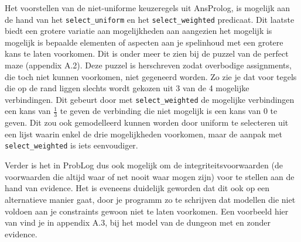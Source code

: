 \documentclass{article}
\begin{document}
Het voorstellen van de niet-uniforme keuzeregels uit AnsProlog, is mogelijk aan de hand van het \texttt{select\_uniform} en het \texttt{select\_weighted} predicaat. Dit laatste biedt een grotere variatie aan mogelijkheden aan aangezien het mogelijk is mogelijk is bepaalde elementen of aspecten aan je spelinhoud met een grotere kans te laten voorkomen. Dit is onder meer te zien bij de puzzel van de perfect maze (appendix A.2). Deze puzzel is herschreven zodat overbodige assignments, die toch niet kunnen voorkomen, niet gegeneerd worden. Zo zie je dat voor tegels die op de rand liggen slechts wordt gekozen uit 3 van de 4 mogelijke verbindingen. Dit gebeurt door met \texttt{select\_weighted} de mogelijke verbindingen een kans van $\frac{1}{3}$ te geven de verbinding die niet mogelijk is een kans van 0 te geven. Dit zou ook gemodelleerd kunnen worden door uniform te selecteren uit een lijst waarin enkel de drie mogelijkheden voorkomen, maar de aanpak met \texttt{select\_weighted} is iets eenvoudiger.

Verder is het in ProbLog dus ook mogelijk om de integriteitsvoorwaarden (de voorwaarden die altijd waar of net nooit waar mogen zijn) voor te stellen aan de hand van evidence. Het is eveneens duidelijk geworden dat dit ook op een alternatieve manier gaat, door je programm zo te schrijven dat modellen die niet voldoen aan je constraints gewoon niet te laten voorkomen. Een voorbeeld hier van vind je in appendix A.3, bij het model van de dungeon met en zonder evidence.
\end{document}
